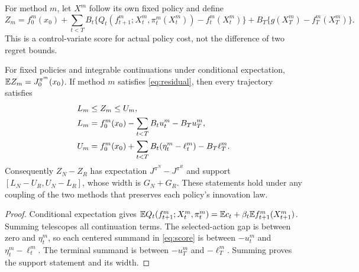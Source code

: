 \documentclass[ecta,nameyear,draft]{econsocart}
\begin{document}
For method $m$, let $X^m$ follow its own fixed policy and define
\begin{equation}\label{eq:score}
 Z_m=f_0^m(x_0)+\sum_{t<T}B_t
  \{Q_t(f_{t+1}^m;X_t^m,\pi_t^m(X_t^m))-f_t^m(X_t^m)\}
       +B_T\{g(X_T^m)-f_T^m(X_T^m)\}.
\end{equation}
This is a control-variate score for actual policy cost, not the difference of two regret bounds.

\begin{theorem}\label{thm:paired}
For fixed policies and integrable continuations under conditional expectation,
$\mathbb E Z_m=J^{\pi^m}_0(x_0)$. If method $m$ satisfies \eqref{eq:residual}, then every trajectory satisfies
\begin{align}\label{eq:support}
 L_m&\leq Z_m\leq U_m,\\
 L_m&=f_0^m(x_0)-\sum_{t<T}B_tu_t^m-B_Tu_T^m,\notag\\
 U_m&=f_0^m(x_0)+\sum_{t<T}B_t(\eta_t^m-\ell_t^m)-B_T\ell_T^m.\notag
\end{align}
Consequently $Z_N-Z_R$ has expectation $J^{\pi^N}-J^{\pi^R}$ and support
$[L_N-U_R,U_N-L_R]$, whose width is $G_N+G_R$. These statements hold under any coupling of the two methods that preserves each policy's innovation law.
\end{theorem}

\begin{proof}
Conditional expectation gives $\mathbb E Q_t(f_{t+1}^m;X_t^m,\pi_t^m)=\mathbb E c_t+\beta_t\mathbb E f_{t+1}^m(X_{t+1}^m)$. Summing telescopes all continuation terms. The selected-action gap is between zero and $\eta_t^m$, so each centered summand in \eqref{eq:score} is between $-u_t^m$ and $\eta_t^m-\ell_t^m$. The terminal summand is between $-u_T^m$ and $-\ell_T^m$. Summing proves the support statement and its width.
\end{proof}
\end{document}
